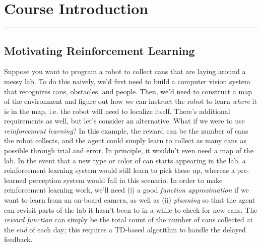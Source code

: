 \documentclass[12pt]{article}
\begin{document}
\renewcommand{\d}[1]{\ensuremath{\operatorname{d}\!{#1}}}

\tableofcontents
\newpage
\section{Course Introduction}\vspace{.1pt} \hrule height 2pt \smallskip \renewcommand{\arraystretch}{1}
\subsection{Motivating Reinforcement Learning}
Suppose you want to program a robot to collect cans that are laying around a messy lab. To do this naively, we'd first need to build a computer vision system that recognizes cans, obstacles, and people. Then, we'd need to construct a map of the environment and figure out how we can instruct the robot to learn \emph{where} it is in the map, i.e. the robot will need to localize itself. There's additional requirements as well, but let's consider an alternative. What if we were to use \emph{reinforcement learning}? In this example, the reward can be the number of cans the robot collects, and the agent could simply learn to collect as many cans as possible through trial and error. In principle, it wouldn't even need a map of the lab. In the event that a new type or color of can starts appearing in the lab, a reinforcement learning system would still learn to pick these up, whereas a pre-learned perception system would fail in this scenario. In order to make reinforcement learning work, we'll need (i) a good \emph{function approximation} if we want to learn from an on-board camera, as well as (ii) \emph{planning} so that the agent can revisit parts of the lab it hasn't been to in a while to check for new cans. The \emph{reward function} can simply be the total count of the number of cans collected at the \emph{end} of each day; this requires a TD-based algorithm to handle the delayed feedback.
\end{document}
